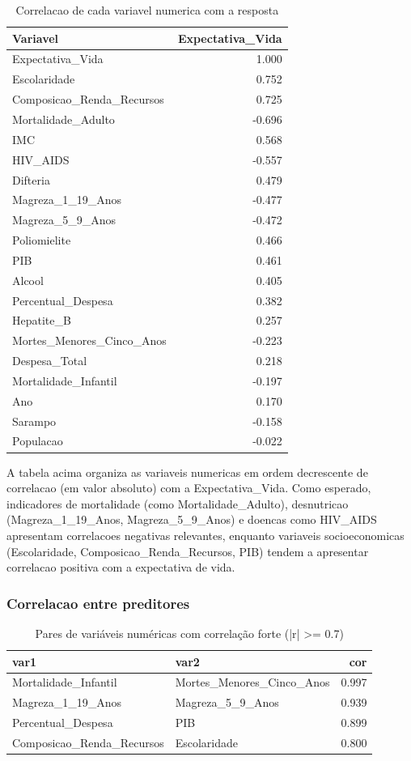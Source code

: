 \documentclass[
  12pt,
]{article}
\begin{document}
\begin{longtable}[t]{lr}
\caption{\label{tab:unnamed-chunk-9}Correlacao de cada variavel numerica com a resposta}\\
\toprule
Variavel & Expectativa\_Vida\\
\midrule
Expectativa\_Vida & 1.000\\
Escolaridade & 0.752\\
Composicao\_Renda\_Recursos & 0.725\\
Mortalidade\_Adulto & -0.696\\
IMC & 0.568\\
\addlinespace
HIV\_AIDS & -0.557\\
Difteria & 0.479\\
Magreza\_1\_19\_Anos & -0.477\\
Magreza\_5\_9\_Anos & -0.472\\
Poliomielite & 0.466\\
\addlinespace
PIB & 0.461\\
Alcool & 0.405\\
Percentual\_Despesa & 0.382\\
Hepatite\_B & 0.257\\
Mortes\_Menores\_Cinco\_Anos & -0.223\\
\addlinespace
Despesa\_Total & 0.218\\
Mortalidade\_Infantil & -0.197\\
Ano & 0.170\\
Sarampo & -0.158\\
Populacao & -0.022\\
\bottomrule
\end{longtable}

A tabela acima organiza as variaveis numericas em ordem decrescente de
correlacao (em valor absoluto) com a Expectativa\_Vida. Como esperado,
indicadores de mortalidade (como Mortalidade\_Adulto), desnutricao
(Magreza\_1\_19\_Anos, Magreza\_5\_9\_Anos) e doencas como HIV\_AIDS
apresentam correlacoes negativas relevantes, enquanto variaveis
socioeconomicas (Escolaridade, Composicao\_Renda\_Recursos, PIB) tendem
a apresentar correlacao positiva com a expectativa de vida.

\subsubsection{Correlacao entre
preditores}\label{correlacao-entre-preditores}

\begin{longtable}[t]{llr}
\caption{\label{tab:unnamed-chunk-10}Pares de variáveis numéricas com correlação forte (|r| >= 0.7)}\\
\toprule
var1 & var2 & cor\\
\midrule
Mortalidade\_Infantil & Mortes\_Menores\_Cinco\_Anos & 0.997\\
Magreza\_1\_19\_Anos & Magreza\_5\_9\_Anos & 0.939\\
Percentual\_Despesa & PIB & 0.899\\
Composicao\_Renda\_Recursos & Escolaridade & 0.800\\
\bottomrule
\end{longtable}
\end{document}
